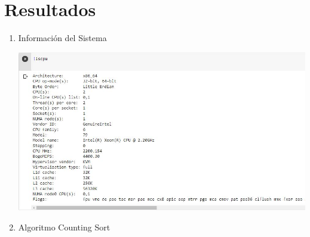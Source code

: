\documentclass{article}
\begin{document}
\section{Resultados}


    \begin{enumerate}
        \item Información del Sistema
        
        \includegraphics[width=\textwidth]{Imagen/Captura1}
	   
        \item Algoritmo Counting Sort
        

\end{enumerate}
\end{document}
